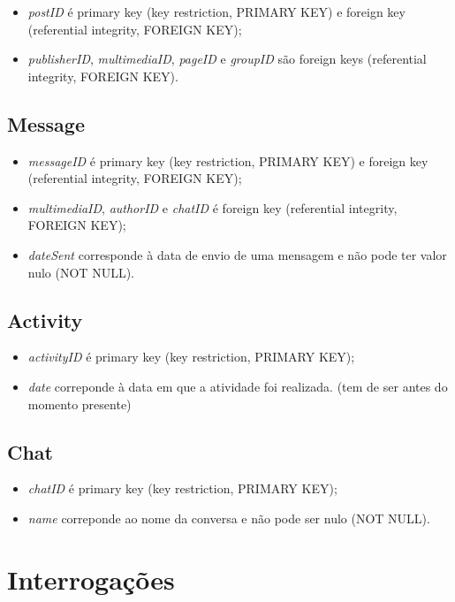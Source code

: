 \documentclass[12pt]{report}
\begin{document}
\begin{itemize}
    \item \textit{postID} é primary key (key restriction, PRIMARY KEY) e foreign key (referential integrity, FOREIGN KEY);
    \item \textit{publisherID}, \textit{multimediaID}, \textit{pageID} e \textit{groupID} são foreign keys (referential integrity, FOREIGN KEY).
\end{itemize}
    
\section{Message}

\begin{itemize}
    \item \textit{messageID} é primary key (key restriction, PRIMARY KEY) e foreign key (referential integrity, FOREIGN KEY);
    \item \textit{multimediaID}, \textit{authorID} e \textit{chatID} é foreign key (referential integrity, FOREIGN KEY);
    \item \textit{dateSent} corresponde à data de envio de uma mensagem e não pode ter valor nulo (NOT NULL).
\end{itemize}

\section{Activity}

\begin{itemize}
    \item \textit{activityID} é primary key (key restriction, PRIMARY KEY);
    \item \textit{date} correponde à data em que a atividade foi realizada. (tem de ser antes do momento presente)
\end{itemize}

\section{Chat}

\begin{itemize}
    \item \textit{chatID} é primary key (key restriction, PRIMARY KEY);
    \item \textit{name} correponde ao nome da conversa e não pode ser nulo (NOT NULL).
\end{itemize}

\chapter{Interrogações}
\end{document}
